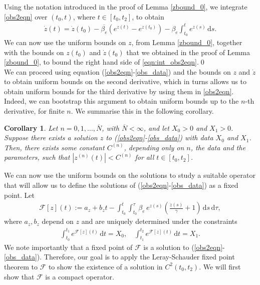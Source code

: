 \documentclass{article}
\newtheorem{cor}[thm]{Corollary}
\newcommand{\ds}{\text{d}s}
\newcommand{\dtau}{\text{d}\tau}
\newcommand{\dt}{\text{d}t}
\newcommand{\obs}{(\ref{obs2eqn}-\ref{obs_data})}
\newcommand{\obss}{(\ref{obs2eqn}-\ref{obs_data}) }
\newcommand{\be}{\beta_e}
\newcommand{\bb}{\overline{\be}}
\newcommand{\F}{\mathcal{F}}
\begin{document}
\proof Using the notation introduced in the proof of Lemma \ref{zbound_0}, we integrate \eqref{obs2eqn} over $(t_0,t)$, where $t \in [t_0,t_2]$, to obtain 
%
\begin{align}
    \dot{z}(t) = \dot{z}(t_0) -  \bb \left( e^{z(t)} - e^{z(t_0)} \right) - \be \int_{t_0}^t e^{z(s)} \, \ds. \label{eqn:int_obs2eqn}
\end{align}
%
We can now use the uniform bounds on $z$, from Lemma \ref{zbound_0}, together with the bounds on $z(t_0)$ and $\dot{z}(t_0)$ that we obtained in the proof of Lemma \ref{zbound_0}, to bound the right hand side of \eqref{eqn:int_obs2eqn}.\qed \\


We can proceed using equation \obss and the bounds on $z$ and $\dot{z}$ to obtain uniform bounds on the second derivative, which in turns allows us to obtain uniform bounds for the third derivative by using them in \eqref{obs2eqn}. Indeed, we can bootstrap this argument to obtain uniform bounds up to the $n$-th derivative, for finite $n$. We summarise this in the following corollary.

\begin{cor} \label{thm:all_bounds}
Let $n=0,1,\dots,\overline{N}$, with $\overline{N} < \infty$, and let $X_0>0$ and $X_1>0$. Suppose there exists a solution $z$ to \obss with data $X_0$ and $X_1$. Then, there exists some constant $C^{(n)}$, depending only on $n$, the data and the parameters, such that $|z^{(n)}(t)| < C^{(n)}$ for all $t\in[t_0,t_2]$.
\end{cor}

We can now use the uniform bounds on the solutions to study a suitable operator that will allow us to define the solutions of \obss as a fixed point. Let
%
\begin{align}
    \F[z](t) := a_z + b_z t - \int_{t_0}^{t} 
\int_{t_0}^\tau \be \, e^{z(s)} \left( \frac{\dot{z}(s)}{\gamma} + 1 \right) \, \ds \, \dtau, \label{F_operator}
\end{align}
%
where $a_z,b_z$ depend on $z$ and are uniquely determined under the constraints
%
\begin{align}
    \int_{t_0}^{t_1} e^{\F[z](t)} \, \dt = X_0,\quad \int_{t_1}^{t_2} e^{\F[z](t)} \, \dt = X_1. \label{F_operator_cons}
\end{align}
%
We note importantly that a fixed point of $\F$ is a solution to \obs. Therefore, our goal is to apply the Leray-Schauder fixed point theorem to $\F$ to show the existence of a solution in $C^2(t_0,t_2)$. We will first show that $\F$ is a compact operator. 
\end{document}

